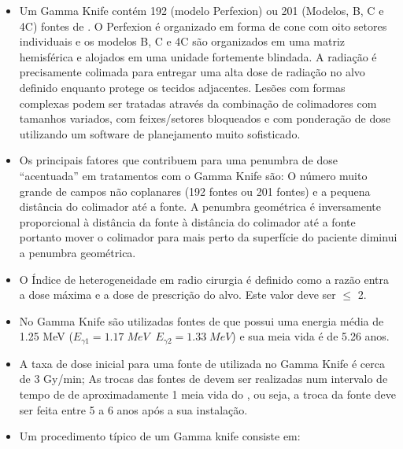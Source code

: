 \documentclass[11pt,a4paper]{article}
\newcounter{exemplo}
\begin{document}
\begin{exemplo}
\begin{itemize}
        \item Um Gamma Knife contém 192 (modelo Perfexion) ou 201 (Modelos, B, C e 4C) fontes de . O Perfexion é organizado em forma de cone com oito setores individuais e os modelos B, C e 4C são organizados em uma matriz hemisférica e alojados em uma unidade fortemente blindada. A radiação é precisamente colimada para entregar uma alta dose de radiação no alvo definido enquanto protege os tecidos adjacentes. Lesões com formas complexas podem ser tratadas através da combinação de colimadores com tamanhos variados, com feixes/setores bloqueados e com ponderação de dose utilizando um software de planejamento muito sofisticado.
        
        \item Os principais fatores que contribuem para uma penumbra de dose ``acentuada'' em tratamentos com o Gamma Knife são: O número muito grande de campos não coplanares (192 fontes ou 201 fontes) e a pequena distância do colimador até a fonte. A penumbra geométrica é inversamente proporcional à distância da fonte à distância do colimador até a fonte portanto mover o colimador para mais perto da superfície do paciente diminui a penumbra geométrica.
        
        \item O Índice de heterogeneidade em radio cirurgia é definido como a razão entra a dose máxima e a dose de prescrição do alvo. Este valor deve ser $\leq$ 2.
        
        \item No Gamma Knife são utilizadas fontes de  que possui uma energia média de 1.25 MeV ($E_{\gamma 1} = 1.17 \; MeV \; \;  E_{\gamma 2} = 1.33 \; MeV$) e sua meia vida é de 5.26 anos.
        
        \item A taxa de dose inicial para uma fonte de  utilizada no Gamma Knife é cerca de 3 Gy/min; As trocas das fontes de  devem ser realizadas num intervalo de tempo de de aproximadamente 1 meia vida do , ou seja, a troca da fonte deve ser feita entre 5 a 6 anos após a sua instalação.
        
        \item Um procedimento típico de um Gamma knife consiste em:
        

\end{itemize}
\end{exemplo}
\end{document}
